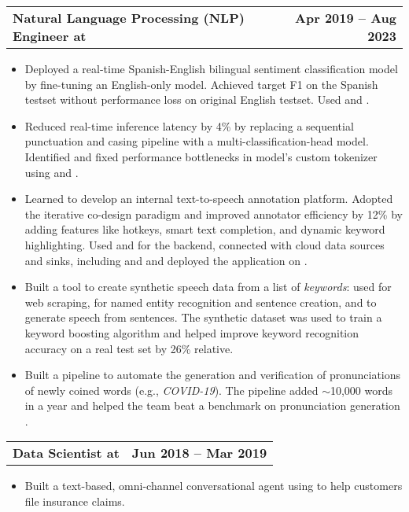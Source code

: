 \documentclass{ExpressiveResume}
\makeatletter
\newcommand{\mainBullet}{\hspace{12pt}\color{blue}\fontsize{11}{13.2}\selectfont{\ding{70}}}
\newcommand{\myresumesubsection}[2]{%
    \noindent\begin{tabular*}{\linewidth}{@{}l@{\extracolsep{\fill}}r@{}}
    {\subsectionfont\bfseries #1} & {\subsectionfont\bfseries #2}\\
  \end{tabular*}\par
}
\makeatother
\begin{document}
\myresumesubsection{\mainBullet Natural Language Processing (NLP) Engineer at \tech{Dialpad Canada Inc.}}{Apr 2019 -- Aug 2023}
\begin{itemize}[leftmargin=*, label={}]
    \item Deployed a real-time Spanish-English bilingual sentiment classification model by fine-tuning an English-only model. Achieved target F1 on the Spanish testset without performance loss on original English testset. Used  and .
    \item Reduced real-time inference latency by 4\% by replacing a sequential punctuation and casing pipeline with a multi-classification-head  model. Identified and fixed performance bottlenecks in model's custom tokenizer using  and .
    \item Learned  to develop an internal text-to-speech annotation platform. Adopted the iterative co-design paradigm and improved annotator efficiency by 12\% by adding features like hotkeys, smart text completion, and dynamic keyword highlighting.
    Used  and  for the backend, connected with cloud data sources and sinks, including  and  and deployed the application on .
    \item Built a tool to create synthetic speech data from a list of \emph{keywords}: used  for web scraping,  for named entity recognition and sentence creation, and  to generate speech from sentences. The synthetic dataset was used to train a keyword boosting algorithm \cite{li2023ngramboostingimprovingcontextual} and helped improve keyword recognition accuracy on a real test set by 26\% relative.
    \item Built a  pipeline to automate the generation and verification of pronunciations of newly coined words (e.g., \emph{COVID-19}). The pipeline added $\sim$10,000 words in a year and helped the team beat a benchmark on pronunciation generation \cite{gautam-etal-2021-avengers}.
\end{itemize}

\myresumesubsection{\mainBullet Data Scientist at \tech{Exzeo Software, India}}{Jun 2018 -- Mar 2019}
\begin{itemize}[leftmargin=*, label={}]
    \item Built a text-based, omni-channel conversational agent using  to help customers file insurance claims.
\end{itemize}
\end{document}
